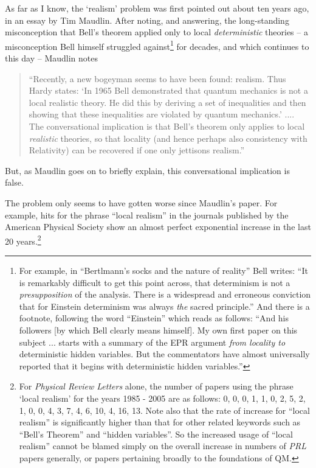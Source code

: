 \documentclass[12pt]{article}
\begin{document}
As far as I know, the `realism' problem was first pointed out about
ten years ago, in an essay by Tim Maudlin.  After noting, and 
answering, the long-standing misconception that Bell's theorem 
applied only to local \emph{deterministic} theories -- a misconception
Bell himself struggled against\footnote{For example, 
  in ``Bertlmann's socks and the nature of
  reality'' \cite[pages 139-158]{bell} Bell writes: ``It is remarkably
  difficult to get this point across, that determinism is not a
  \emph{presupposition} of the analysis.  There is a widespread and
  erroneous conviction that for Einstein determinism was always
  \emph{the} sacred principle.''  And there is a footnote, following
  the word ``Einstein'' which reads as follows:  ``And his followers
  [by which Bell clearly means himself].  My own first paper on this
  subject ... starts with a summary of the EPR argument \emph{from
    locality to} deterministic hidden variables.  But the commentators
  have almost universally reported that it begins with deterministic
  hidden variables.''} 
for decades, and which continues to this day -- Maudlin notes
\begin{quote}
``Recently, a new bogeyman seems to have been found: realism.
Thus Hardy states: `In 1965 Bell demonstrated that quantum mechanics
is not a local realistic theory.  He did this by deriving a set of
inequalities and then showing that these inequalities are violated by
quantum mechanics.' ....  The conversational implication
is that Bell's theorem only applies to local \emph{realistic}
theories, so that locality (and hence perhaps also consistency with
Relativity) can be recovered if one only jettisons realism.''  
\cite[page 304]{maudlin}  
\end{quote}
But, as Maudlin goes on to briefly explain, this conversational 
implication is false.

The problem only seems to have gotten worse since Maudlin's paper.
For example,
hits for the phrase ``local realism'' in the journals published by the
American Physical Society show an almost perfect exponential increase
in the last 20 years.\footnote{For 
  \emph{Physical Review Letters} alone, the number of
  papers using the phrase `local realism' for the years 1985 - 2005
  are as follows:  0, 0, 0, 1, 1, 0, 2, 5, 2, 1, 0, 0, 4, 3, 7, 4, 6,
  10, 4, 16, 13.  Note also that the rate of increase for ``local
  realism'' is significantly higher than that for other related
  keywords such as ``Bell's Theorem'' and ``hidden variables''.  So
  the increased usage of ``local realism'' cannot be blamed simply on
  the overall increase in numbers of \emph{PRL} papers generally, or papers
  pertaining broadly to the foundations of QM.}
\end{document}
